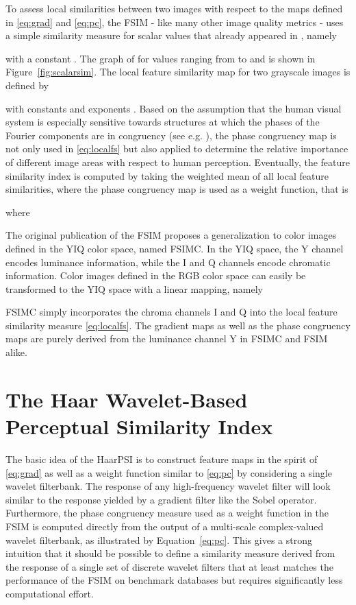 \documentclass[11pt,a4paper]{article}
\begin{document}
To assess local similarities between two images with respect to the maps defined in \eqref{eq:grad} and \eqref{eq:pc}, the FSIM - like many other image quality metrics - uses a simple similarity measure for scalar values that already appeared in \cite{WBSS2004}, namely

with a constant . The graph of  for values ranging from  to  and  is shown in Figure~\ref{fig:scalarsim}. The local feature similarity map for two grayscale images  is defined by
\setlength{\arraycolsep}{0.0em}

\setlength{\arraycolsep}{5pt}
with constants  and exponents . Based on the assumption that the human visual system is especially sensitive towards structures at which the phases of the Fourier components are in congruency (see e.g. \cite{MRBO1986}), the phase congruency map is not only used in \eqref{eq:localfs} but also applied to determine the relative importance of different image areas with respect to human perception. Eventually, the feature similarity index is computed by taking the weighted mean of all local feature similarities, where the phase congruency map is used as a weight function, that is

where


The original publication of the FSIM proposes a generalization to color images defined in the YIQ color space, named FSIMC. In the YIQ space, the Y channel encodes luminance information, while the I and Q channels encode chromatic information. Color images defined in the RGB color space can easily be transformed to the YIQ space with a linear mapping, namely



FSIMC simply incorporates the chroma channels I and Q into the local feature similarity measure \eqref{eq:localfs}. The gradient maps as well as the phase congruency maps are purely derived from the luminance channel Y in FSIMC and FSIM alike. 






\section{The Haar Wavelet-Based Perceptual Similarity Index}
\label{sec:HaarPSI}

The basic idea of the HaarPSI is to construct feature maps in the spirit of \eqref{eq:grad} as well as a weight function similar to \eqref{eq:pc} by considering a single wavelet filterbank. The response of any high-frequency wavelet filter will look similar to the response yielded by a gradient filter like the Sobel operator. Furthermore, the phase congruency measure used as a weight function in the FSIM is computed directly from the output of a multi-scale complex-valued wavelet filterbank, as illustrated by Equation~\eqref{eq:pc}. This gives a strong intuition that it should be possible to define a similarity measure derived from the response of a single set of discrete wavelet filters that at least matches the performance of the FSIM on benchmark databases but requires significantly less computational effort.
\end{document}
